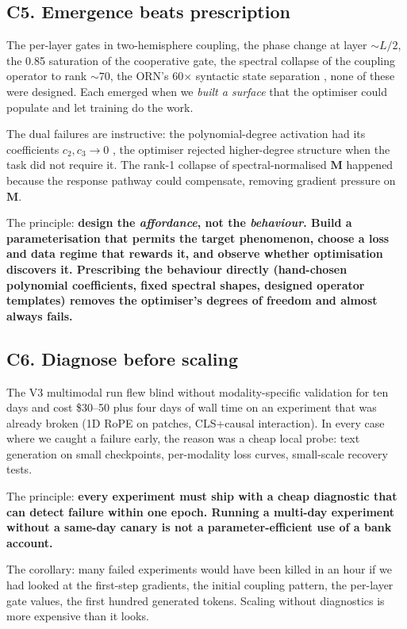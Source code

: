 \documentclass[11pt, a4paper]{article}
\newcommand{\M}{\mathbf{M}}
\begin{document}
\subsection{C5. Emergence beats prescription}

The per-layer gates in two-hemisphere coupling, the phase change at layer $\sim L/2$, the 0.85 saturation of the cooperative gate, the spectral collapse of the coupling operator to rank $\sim 70$, the ORN's 60$\times$ syntactic state separation ,  none of these were designed. Each emerged when we \emph{built a surface} that the optimiser could populate and let training do the work.

The dual failures are instructive: the polynomial-degree activation had its coefficients $c_2, c_3 \to 0$ ,  the optimiser rejected higher-degree structure when the task did not require it. The rank-1 collapse of spectral-normalised $\M$ happened because the response pathway could compensate, removing gradient pressure on $\M$.

The principle: \textbf{design the \emph{affordance}, not the \emph{behaviour}. Build a parameterisation that permits the target phenomenon, choose a loss and data regime that rewards it, and observe whether optimisation discovers it. Prescribing the behaviour directly (hand-chosen polynomial coefficients, fixed spectral shapes, designed operator templates) removes the optimiser's degrees of freedom and almost always fails.}

\subsection{C6. Diagnose before scaling}

The V3 multimodal run flew blind without modality-specific validation for ten days and cost \$30--50 plus four days of wall time on an experiment that was already broken (1D RoPE on patches, CLS+causal interaction). In every case where we caught a failure early, the reason was a cheap local probe: text generation on small checkpoints, per-modality loss curves, small-scale recovery tests.

The principle: \textbf{every experiment must ship with a cheap diagnostic that can detect failure within one epoch. Running a multi-day experiment without a same-day canary is not a parameter-efficient use of a bank account.}

The corollary: many failed experiments would have been killed in an hour if we had looked at the first-step gradients, the initial coupling pattern, the per-layer gate values, the first hundred generated tokens. Scaling without diagnostics is more expensive than it looks.
\end{document}
